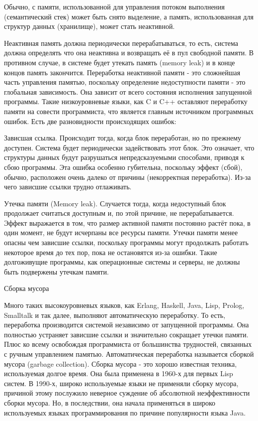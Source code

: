 Обычно, с памяти, использованной для управления потоком выполнения (семантический стек) может быть снято выделение, а память, использованная для структур данных (хранилище), может стать неактивной.

Неактивная память должна периодически перерабатываться, то есть, система должна определять что она неактивна и возвращать её в пул свободной памяти. В противном случае, в системе будет утекать память (memory leak) и в конце концов память закончится. Переработка неактивной памяти - это сложнейшая часть управления памятью, поскольку определение недоступности памяти - это глобальная зависимость. Она зависит от всего состояния исполнения запущенной программы. Такие низкоуровневые языки, как C и C++ оставляют переработку памяти на совести программиста, что является главным источником программных ошибок. Есть две разновидности происходящих ошибок:

Зависшая ссылка. Происходит тогда, когда блок переработан, но по прежнему доступен. Система будет периодически задействовать этот блок. Это означает, что структуры данных будут разрушаться непредсказуемыми способами, приводя к сбою программы. Эта ошибка особенно губительна, поскольку эффект (сбой), обычно, расположен очень далеко от причины (некорректная переработка). Из-за чего зависшие ссылки трудно отлаживать.

Утечка памяти (Memory leak). Случается тогда, когда недоступный блок продолжает считаться доступным и, по этой причине, не перерабатывается. Эффект выражается в том, что размер активной памяти постоянно растёт пока, в один момент, не будут исчерпаны все ресурсы памяти. Утечки памяти менее опасны чем зависшие ссылки, поскольку программы могут продолжать работать некоторое время до тех пор, пока не остановятся из-за ошибки. Такие долгоживущие программы, как операционные системы и серверы, не должны быть подвержены утечкам памяти.

Сборка мусора

Много таких высокоуровневых языков, как Erlang, Haskell, Java, Lisp, Prolog, Smalltalk и так далее, выполняют автоматическую переработку. То есть, переработка производится системой независимо от запущенной программы. Она полностью устраняет зависшие ссылки и значительно сокращает утечки памяти. Плюс ко всему освобождая программиста от большинства трудностей, связанных с ручным управлением памятью. Автоматическая переработка называется сборкой мусора (garbage collection). Сборка мусора - это хорошо известная техника, используемая долгое время. Она была применена в 1960-х для первых Lisp систем. В 1990-х, широко используемые языки не применяли сборку мусора, причиной этому послужило неверное суждение об абсолютной неэффективности сборки мусора. Но, в последствии, она начала применяться в широко используемых языках программирования по причине популярности языка Java.

